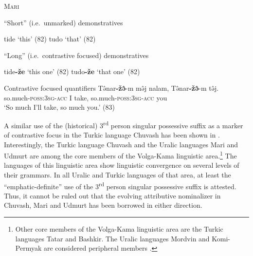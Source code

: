 \begin{exe}
\ex \textsc{Mari} \citep{alhoniemi1993}%
\begin{xlist}
\ex “Short” (i.e.~unmarked) demonstratives 
\begin{xlist}
\ex tide ‘this’ (82)
\ex tudo ‘that’ (82)
\end{xlist}
\ex “Long” (i.e.~contrastive focused) demonstratives 
\begin{xlist}
\ex tide\textbf{-že} ‘this one’ (82)
\ex tudo\textbf{-že} ‘that one’ (82)
\end{xlist}
\ex Contrastive focused quantifiers
\gll	Tə̂nar\textbf{-žə̂}-m mə̂j nalam, Tə̂nar\textbf{-žə̂}-m tə̂j.\\
	so.much-\textsc{poss:3sg}-\textsc{acc} I take, so.much-\textsc{poss:3sg}-\textsc{acc} you\\
\glt	‘So much I'll take, so much you.’ (83)
\end{xlist}
\end{exe}
A similar use of the (historical) 3\textsuperscript{rd} person singular possessive suffix as a marker of contrastive focus in the Turkic language Chuvash has been shown in . Interestingly, the Turkic language Chuvash and the Uralic languages Mari and Udmurt are among the core members of the Volga-Kama linguistic area.\footnote{Other core members of the Volga-Kama linguistic area are the Turkic languages Tatar and Bashkir. The Uralic languages Mordvin and Komi-Permyak are considered peripheral members \citep{helimski2005}.} The languages of this linguistic area show linguistic convergence on several levels of their grammars. In all Uralic and Turkic languages of that area, at least the “emphatic-definite” use of the 3\textsuperscript{rd} person singular possessive suffix is attested. Thus, it cannot be ruled out that the evolving attributive nominalizer in Chuvash, Mari and Udmurt has been borrowed in either direction.%

